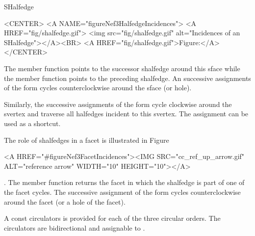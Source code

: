 \begin{ccRefClass}{SHalfedge}
\begin{ccHtmlOnly}
    <CENTER>
    <A NAME="figureNef3HalfedgeIncidences">
    <A HREF="fig/shalfedge.gif">
        <img src="fig/shalfedge.gif" 
             alt="Incidences of an SHalfedge"></A><BR>
    <A HREF="fig/shalfedge.gif">Figure:</A>
    </CENTER>
\end{ccHtmlOnly}

The  member function points 
to the successor shalfedge around this sface while the  member 
function points to the preceding shalfedge.  An
successive assignments of the form  cycles
counterclockwise around the sface (or hole).

Similarly, the successive
assignments of the form  cycle
clockwise around the svertex and traverse all halfedges incident to
this svertex. The assignment  can be 
used as a shortcut.

The role of shalfedges in a facet is illustrated in 
Figure~\begin{ccHtmlOnly}
  <A HREF="#figureNef3FacetIncidences"><IMG 
  SRC="cc_ref_up_arrow.gif" ALT="reference arrow" WIDTH="10" HEIGHT="10"></A>
\end{ccHtmlOnly}. The  member function returns the facet 
in which
the shalfedge is part of one of the facet cycles. The successive assignment of 
the form  cycles counterclockwise around the facet (or a
hole of the facet).

A const circulators is provided for each of the three circular orders.
The circulators are bidirectional and assignable to .


\ccTypes
{}
\ccThreeToTwo



\ccGlue
{}
\ccGlue
{}
\ccGlue
{}

\ccCreation
{}


\end{ccRefClass}
